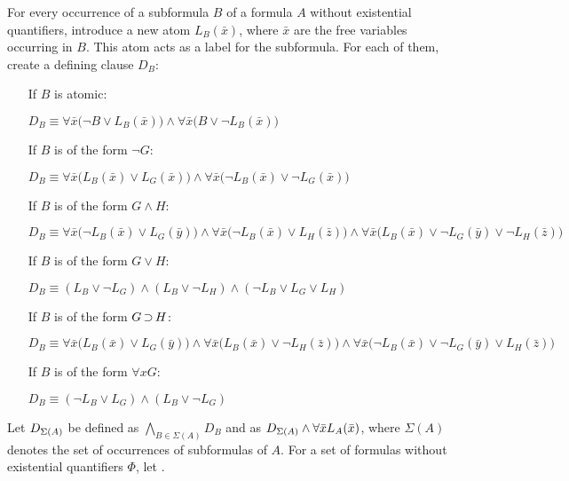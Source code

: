 \begin{defi}
	For every occurrence of a subformula $B$ of a formula $A$ without existential quantifiers, introduce a new atom $L_B(\bar x)$, where $\bar x$ are the free variables occurring in $B$.
	This atom acts as a label for the subformula. 
For each of them, create a defining clause $D_B$:

\begin{itemize}
	\item[If $B$ is atomic:]~

		$D_B\equiv \forall \bar x \big(\lnot B \lor L_B(\bar x)\big) \land \forall \bar x \big(B \lor \lnot L_B(\bar x)\big)  $
	\item[If $B$ is of the form $\lnot G$:]~

		$D_B\equiv \forall \bar x \big(L_B(\bar x) \lor L_G(\bar x)\big) \land \forall \bar x \big(\lnot L_B(\bar x) \lor \lnot L_G(\bar x)\big)$
	\item[If $B$ is of the form $G \land H$:]~

		$D_B\equiv \forall \bar x \big(\lnot L_B(\bar x) \lor L_G(\bar y)\big) \land \forall \bar x \big(\lnot L_B(\bar x) \lor L_H(\bar z)\big) \land \forall \bar x \big(L_B(\bar x) \lor \lnot L_G(\bar y) \lor \lnot L_H(\bar z)\big)  $
	\item[If $B$ is of the form $G \lor H$:]~

		$D_B\equiv (L_B \lor \lnot L_G) \land (L_B \lor \lnot L_H) \land (\lnot L_B \lor L_G \lor L_H)  $
	\item[If $B$ is of the form $G \operatorname{\supset} H$:]~

		$D_B\equiv \forall \bar x \big(L_B(\bar x) \lor L_G(\bar y)\big) \land
		\forall \bar x \big(L_B(\bar x) \lor \lnot L_H(\bar z)\big) \land \forall \bar x \big(\lnot L_B(\bar x) \lor \lnot L_G(\bar y) \lor L_H(\bar z)\big)  $
	\item[If $B$ is of the form $\forall x G$:]~

		$D_B\equiv (\lnot L_B \lor L_G) \land (L_B \lor \lnot L_G)$
\end{itemize}

Let $D_{\Sigma(A)}$ be defined as $\bigwedge_{B \in \Sigma(A)} D_B$ and
 as $D_{\Sigma(A)} \land \forall \bar x L_A(\bar x)$, where $\Sigma(A)$ denotes the set of occurrences of subformulas of $A$.
For a set of formulas without existential quantifiers $\Phi$, let .
\end{defi}

